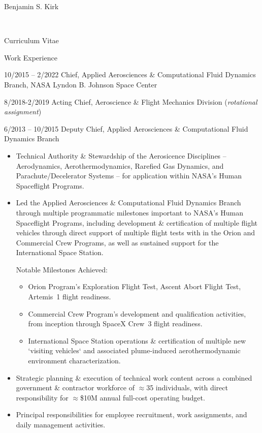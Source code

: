 \documentclass[10pt]{report}
\begin{document}
\begin{cv}{\centerline{\Large Benjamin S. Kirk}\\
    \centerline{\large Curriculum Vitae}}
\begin{cvlist}{Work Experience}
  \item[10/2015 -- 2/2022]
    Chief, Applied Aerosciences \& Computational Fluid Dynamics Branch,  NASA Lyndon B. Johnson Space Center
  \item[8/2018-2/2019]
    Acting Chief, Aeroscience \& Flight Mechanics Division (\emph{rotational assignment})
  \item[6/2013 -- 10/2015]
    Deputy Chief, Applied Aerosciences \& Computational Fluid Dynamics Branch
    \begin{itemize}
    \item
      Technical Authority \& Stewardship of the Aerosicence Disciplines -- Aerodynamics, Aerothermodynamics, Rarefied Gas Dynamics, and Parachute/Decelerator Systems -- for application within NASA's Human Spaceflight Programs.
    \item
      Led the Applied Aerosciences \& Computational Fluid Dynamics Branch through multiple programmatic milestones important to NASA's Human Spaceflight Programs, including development \& certification of multiple flight vehicles through direct support of multiple flight tests with in the Orion and Commercial Crew Programs, as well as sustained support for the International Space Station.

      Notable Milestones Achieved:
      \begin{itemize}
      \item Orion Program's Exploration Flight Test, Ascent Abort Flight Test, Artemis~1 flight readiness.
      \item Commercial Crew Program's development and qualification activities, from inception through SpaceX Crew~3 flight readiness.
      \item International Space Station operations \& certification of multiple new `visiting vehicles` and associated plume-induced aerothermodynamic environment characterization.
      \end{itemize}

    \item
      Strategic planning \& execution of technical work content across a combined government \& contractor workforce of $\approx$35 individuals, with direct responsibility for $\approx$\$10M annual full-cost operating budget.

    \item
      Principal responsibilities for employee recruitment, work assignments, and daily management activities.
    \end{itemize}



\end{cvlist}
\end{cv}
\end{document}

